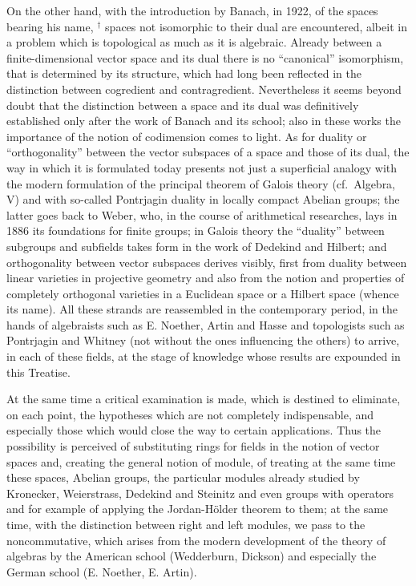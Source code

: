 On the other hand, with the introduction by Banach, in 1922, of the spaces bearing his name, \(^{\dagger}\) spaces not isomorphic to their dual are encountered, albeit in a problem which is topological as much as it is algebraic. Already between a finite-dimensional vector space and its dual there is no ``canonical'' isomorphism, that is determined by its structure, which had long been reflected in the distinction between cogredient and contragredient. Nevertheless it seems beyond doubt that the distinction between a space and its dual was definitively established only after the work of Banach and its school; also in these works the importance of the notion of codimension comes to light. As for duality or ``orthogonality'' between the vector subspaces of a space and those of its dual, the way in which it is formulated today presents not just a superficial analogy with the modern formulation of the principal theorem of Galois theory (cf.~Algebra, V) and with so-called Pontrjagin duality in locally compact Abelian groups; the latter goes back to Weber, who, in the course of arithmetical researches, lays in 1886 its foundations for finite groups; in Galois theory the ``duality'' between subgroups and subfields takes form in the work of Dedekind and Hilbert; and orthogonality between vector subspaces derives visibly, first from duality between linear varieties in projective geometry and also from the notion and properties of completely orthogonal varieties in a Euclidean space or a Hilbert space (whence its name). All these strands are reassembled in the contemporary period, in the hands of algebraists such as
E. Noether, Artin and Hasse and topologists such as Pontrjagin and Whitney (not without the ones influencing the others) to arrive, in each of these fields, at the stage of knowledge whose results are expounded in this Treatise.

At the same time a critical examination is made, which is destined to eliminate, on each point, the hypotheses which are not completely indispensable, and especially those which would close the way to certain applications. Thus the possibility is perceived of substituting rings for fields in the notion of vector spaces and, creating the general notion of module, of treating at the same time these spaces, Abelian groups, the particular modules already studied by Kronecker, Weierstrass, Dedekind and Steinitz and even groups with operators and for example of applying the Jordan-Hölder theorem to them; at the same time, with the distinction between right and left modules, we pass to the noncommutative, which arises from the modern development of the theory of algebras by the American school (Wedderburn, Dickson) and especially the German school (E. Noether, E. Artin).


